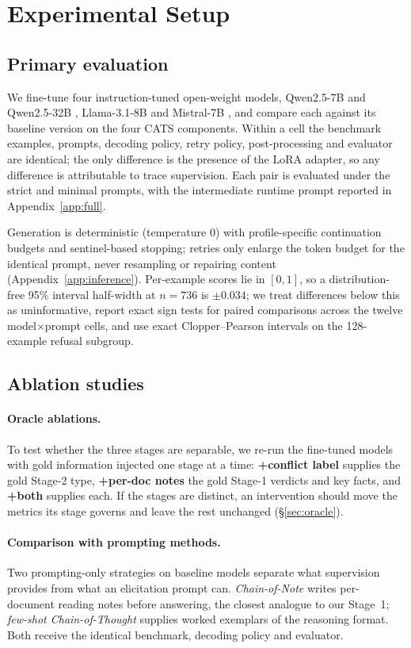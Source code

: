 \section{Experimental Setup}
\label{sec:setup}

\subsection{Primary evaluation}

We fine-tune four instruction-tuned open-weight models, Qwen2.5-7B and
Qwen2.5-32B \citep{yang2024qwen25}, Llama-3.1-8B \citep{dubey2024llama3} and
Mistral-7B \citep{jiang2023mistral7b}, and compare each against its baseline
version on the four CATS components. Within a cell the benchmark examples,
prompts, decoding policy, retry policy, post-processing and evaluator are
identical; the only difference is the presence of the LoRA adapter, so any
difference is attributable to trace supervision. Each pair is evaluated under
the strict and minimal prompts, with the intermediate runtime prompt reported in
Appendix~\ref{app:full}.

Generation is deterministic (temperature $0$) with profile-specific continuation
budgets and sentinel-based stopping; retries only enlarge the token budget for
the identical prompt, never resampling or repairing content
(Appendix~\ref{app:inference}). Per-example scores lie in $[0,1]$, so a
distribution-free 95\% interval half-width at $n=736$ is $\pm0.034$; we treat
differences below this as uninformative, report exact sign tests for paired
comparisons across the twelve model$\times$prompt cells, and use exact
Clopper--Pearson intervals on the 128-example refusal subgroup.

\subsection{Ablation studies}

\paragraph{Oracle ablations.} To test whether the three stages are separable, we
re-run the fine-tuned models with gold information injected one stage at a time:
\textbf{+conflict label} supplies the gold Stage-2 type, \textbf{+per-doc notes}
the gold Stage-1 verdicts and key facts, and \textbf{+both} supplies each. If the
stages are distinct, an intervention should move the metrics its stage governs
and leave the rest unchanged (\S\ref{sec:oracle}).
\paragraph{Comparison with prompting methods.} Two prompting-only strategies on
baseline models separate what supervision provides from what an elicitation
prompt can. \emph{Chain-of-Note} \citep{yu2024chainofnote} writes per-document
reading notes before answering, the closest analogue to our Stage~1;
\emph{few-shot Chain-of-Thought} \citep{wei2022cot} supplies worked exemplars of
the reasoning format. Both receive the identical benchmark, decoding policy and
evaluator.
